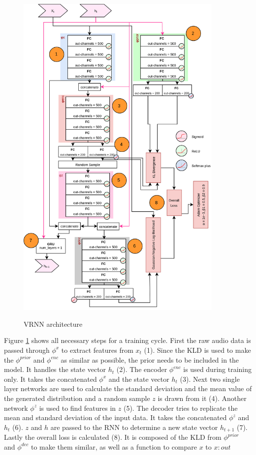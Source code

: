 \documentclass[12pt]{article}
\begin{document}
\begin{figure}[ht!]
\includegraphics[width=0.9\textwidth]{img/vrnn-arch.png}
\label{fig:vrnn-arch}
\caption{VRNN architecture} %
\end{figure}

Figure \ref{fig:vrnn-arch} shows all necessary steps for a training cycle.
First the raw audio data is passed through $\phi^x$ to extract features from $x_t$ (1).
Since the KLD is used to make the $\phi^{prior}$ and $\phi^{enc}$ as similar as possible, the prior needs to be included in the model.
It handles the state vector $h_t$ (2).
The encoder $\phi^{enc}$ is used during training only.
It takes the concatenated $\phi^x$ and the state vector $h_t$ (3).
Next two single layer networks are used to calculate the standard deviation and the mean value of the generated distribution and a random sample $z$ is drawn from it (4).
Another network $\phi^z$ is used to find features in $z$ (5).
The decoder tries to replicate the mean and standard deviation of the input data. %
It takes the concatenated $\phi^z$ and $h_t$ (6).
$z$ and $h$ are passed to the RNN to determine a new state vector $h_{t+1}$ (7).
Lastly the overall loss is calculated (8).
It is composed of the KLD from $\phi^{prior}$ and $\phi^{dec}$ to make them similar, as well as a function to compare $x$ to $x:out$ %
\end{document}
